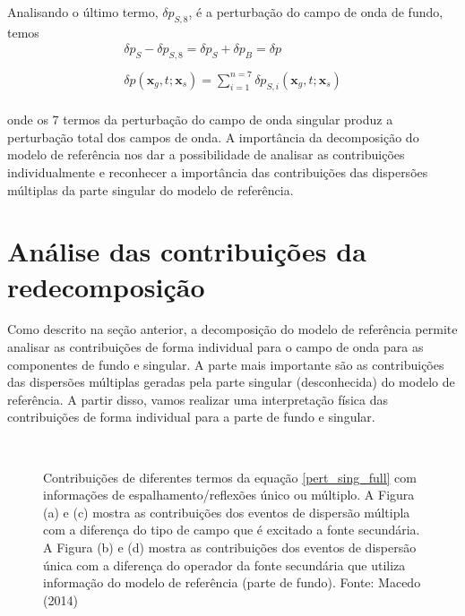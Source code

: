 Analisando o último termo, $\delta p_{S,8}$, é a perturbação do campo de onda de fundo, temos \\
\begin{eqnarray}
\nonumber
   \delta p_{S} - \delta p_{S,8} = \delta p_{S} + \delta p_{B} = \delta p ~~~\\ \nonumber \\
 \delta p(\mathbf{x}_{g},t;\mathbf{x}_{s}) = \sum_{i=1}^{n=7} \delta p_{S,i}(\mathbf{x}_{g},t;\mathbf{x}_{s})
\end{eqnarray}
\\
onde os 7 termos da perturbação do campo de onda singular produz a perturbação total dos campos de onda. A importância da decomposição do modelo de referência nos dar a possibilidade de analisar as contribuições individualmente e reconhecer a importância das contribuições das dispersões múltiplas da parte singular do modelo de referência. 

\section{Análise das contribuições da redecomposição}
Como descrito na seção anterior, a decomposição do modelo de referência permite analisar as contribuições de forma individual para o campo de onda para as componentes de fundo e singular. A parte mais importante são as contribuições das dispersões múltiplas geradas pela parte singular (desconhecida) do modelo de referência. A partir disso, vamos realizar uma interpretação física das contribuições de forma individual para a parte de fundo e singular.  \\

\begin{figure}[h!]
  \centering
   \\
    \caption{Contribuições de diferentes termos da equação \ref{pert_sing_full} com informações de espalhamento/reflexões único ou múltiplo. A Figura (a) e (c) mostra as contribuições dos eventos de dispersão múltipla com a diferença do tipo de campo que é excitado a fonte secundária. A Figura (b) e (d) mostra as contribuições dos eventos de dispersão única com a diferença do operador da fonte secundária que utiliza informação do modelo de referência (parte de fundo). Fonte: Macedo (2014) }
    \label{multiple}
\end{figure}
\\


